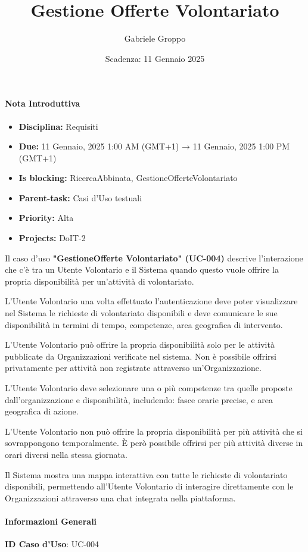 \title{Gestione Offerte Volontariato}
\author{Gabriele Groppo}
\date{Scadenza: 11 Gennaio 2025}

\paragraph{Nota Introduttiva}
\begin{itemize}
\item \textbf{Disciplina:} Requisiti
\item \textbf{Due:} 11 Gennaio, 2025 1:00 AM (GMT+1) → 11 Gennaio, 2025 1:00 PM (GMT+1)
\item \textbf{Is blocking:} RicercaAbbinata, GestioneOfferteVolontariato
\item \textbf{Parent-task:} Casi d'Uso testuali
\item \textbf{Priority:} Alta
\item \textbf{Projects:} DoIT-2
\end{itemize}

Il caso d'uso \textbf{"GestioneOfferte Volontariato" (UC-004)} descrive l'interazione che c'è tra un Utente Volontario e il Sistema quando questo vuole offrire la propria disponibilità per un'attività di volontariato.

L'Utente Volontario una volta effettuato l'autenticazione deve poter visualizzare nel Sistema le richieste di volontariato disponibili e deve comunicare le sue disponibilità in termini di tempo, competenze, area geografica di intervento.

L'Utente Volontario può offrire la propria disponibilità solo per le attività pubblicate da Organizzazioni verificate nel sistema. Non è possibile offrirsi privatamente per attività non registrate attraverso un'Organizzazione.

L'Utente Volontario deve selezionare una o più competenze tra quelle proposte dall’organizzazione e disponibilità, includendo: fasce orarie precise, e area geografica di azione.

L'Utente Volontario non può offrire la propria disponibilità per più attività che si sovrappongono temporalmente. È però possibile offrirsi per più attività diverse in orari diversi nella stessa giornata.

Il Sistema mostra una mappa interattiva con tutte le richieste di volontariato disponibili, permettendo all'Utente Volontario di interagire direttamente con le Organizzazioni attraverso una chat integrata nella piattaforma.
\paragraph{Informazioni Generali}
\textbf{ID Caso d'Uso}: UC-004 

